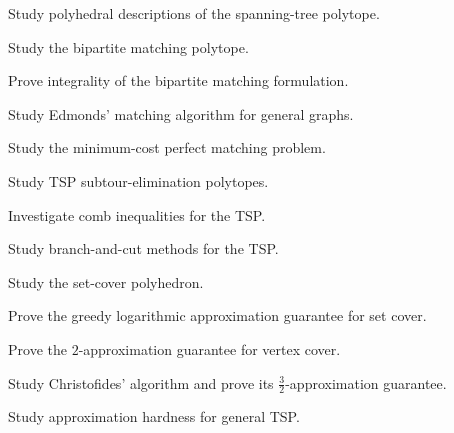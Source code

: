\begin{exercise}[4]
Study polyhedral descriptions of the spanning-tree polytope.
\end{exercise}

\begin{exercise}[4]
Study the bipartite matching polytope.
\end{exercise}

\begin{exercise}[4]
Prove integrality of the bipartite matching formulation.
\end{exercise}

\begin{exercise}[4]
Study Edmonds' matching algorithm for general graphs.
\end{exercise}

\begin{exercise}[4]
Study the minimum-cost perfect matching problem.
\end{exercise}

\begin{exercise}[4]
Study TSP subtour-elimination polytopes.
\end{exercise}

\begin{exercise}[4]
Investigate comb inequalities for the TSP.
\end{exercise}

\begin{exercise}[4]
Study branch-and-cut methods for the TSP.
\end{exercise}

\begin{exercise}[4]
Study the set-cover polyhedron.
\end{exercise}

\begin{exercise}[4]
Prove the greedy logarithmic approximation guarantee for set cover.
\end{exercise}

\begin{exercise}[4]
Prove the \(2\)-approximation guarantee for vertex cover.
\end{exercise}

\begin{exercise}[4]
Study Christofides' algorithm and prove its
\(\frac32\)-approximation guarantee.
\end{exercise}

\begin{exercise}[4]
Study approximation hardness for general TSP.
\end{exercise}

